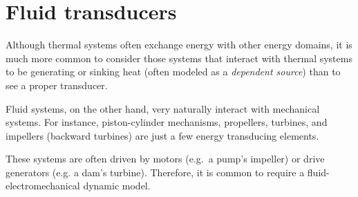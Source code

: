\documentclass[dynamic_systems.tex]{subfiles}
\begin{document}
\section{Fluid transducers}
\tags{}

Although thermal systems often exchange energy with other energy domains, it is much more common to consider those systems that interact with thermal systems to be generating or sinking heat (often modeled as a \emph{dependent source}) than to see a proper transducer.
\tags{}

Fluid systems, on the other hand, very naturally interact with mechanical systems.
For instance, piston-cylinder mechanisms, propellers, turbines, and impellers (backward turbines) are just a few energy transducing elements.
\tags{}

These systems are often driven by motors (e.g.\ a pump's impeller) or drive generators (e.g. a dam's turbine).
Therefore, it is common to require a fluid-electromechanical dynamic model.
\tags{}
\end{document}

